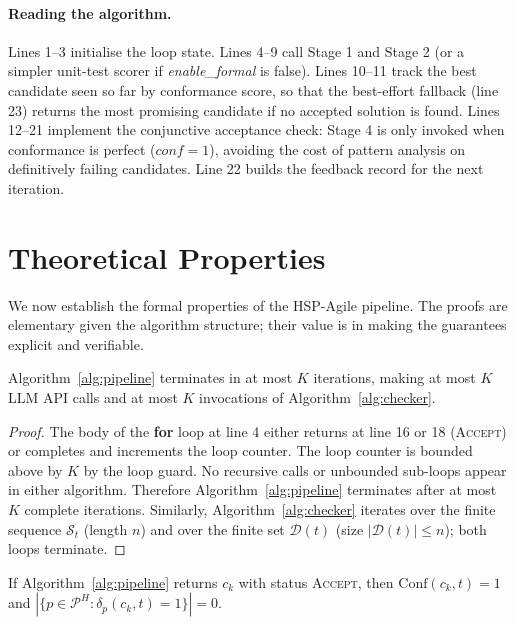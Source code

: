 \paragraph{Reading the algorithm.}
Lines 1--3 initialise the loop state.  Lines 4--9 call Stage 1 and Stage 2
(or a simpler unit-test scorer if \textit{enable\_formal} is false).  Lines
10--11 track the best candidate seen so far by conformance score, so that the
best-effort fallback (line 23) returns the most promising candidate if no
accepted solution is found.  Lines 12--21 implement the conjunctive acceptance
check: Stage 4 is only invoked when conformance is perfect ($\mathit{conf} =
1$), avoiding the cost of pattern analysis on definitively failing candidates.
Line 22 builds the feedback record for the next iteration.

\section{Theoretical Properties}
\label{sec:method:theory}

We now establish the formal properties of the HSP-Agile pipeline.  The proofs
are elementary given the algorithm structure; their value is in making the
guarantees explicit and verifiable.

\begin{theorem}[Termination]
\label{thm:termination}
Algorithm~\ref{alg:pipeline} terminates in at most $K$ iterations,
making at most $K$ LLM API calls and at most $K$ invocations of
Algorithm~\ref{alg:checker}.
\end{theorem}

\begin{proof}
The body of the \textbf{for} loop at line 4 either returns at line 16
or 18 (\textsc{Accept}) or completes and increments the loop counter.
The loop counter is bounded above by $K$ by the loop guard.  No recursive
calls or unbounded sub-loops appear in either algorithm.  Therefore
Algorithm~\ref{alg:pipeline} terminates after at most $K$ complete
iterations.  Similarly, Algorithm~\ref{alg:checker} iterates over the
finite sequence $\mathcal{S}_t$ (length $n$) and over the finite set
$\mathcal{D}(t)$ (size $|\mathcal{D}(t)| \le n$); both loops terminate.
\end{proof}

\begin{theorem}
\label{thm:soundness}
If Algorithm~\ref{alg:pipeline} returns $c_k$ with status \textsc{Accept},
then $\mathrm{Conf}(c_k, t) = 1$ and
$|\{p \in \mathcal{P}^H : \delta_p(c_k, t) = 1\}| = 0$.
\end{theorem}

